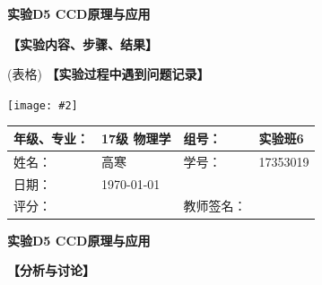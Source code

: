 \documentclass[11pt,a4paper]{ctexart}
\newcommand{\ExpeName}{实验D5 CCD原理与应用}
\newcommand{\cpic}[2]{
\begin{center}
\texttt{[image: \#2]}
\end{center}
}
\begin{document}
\begin{center}
\LARGE{\textbf{\ExpeName}}
\end{center}
\textbf{【实验内容、步骤、结果】}
\par
(表格)
\newline
\textbf{【实验过程中遇到问题记录】}\par
\cpic{0.81}{none}
\fi



\newpage%
\begin{table}[H]
\centering
\begin{tabular}{|p{32mm}|p{32mm}|p{32mm}|p{32mm}|}
\hline
年级、专业： & 17级 物理学 & 组号： & 实验班6 \\ \hline
姓名： & 高寒 & 学号： & 17353019 \\ \hline
日期： & \today &  &  \\ \hline
评分： &  & 教师签名： &  \\ \hline
\end{tabular}
\end{table}
\begin{center}
\LARGE\textbf{{\ExpeName}}
\end{center}
\textbf{【分析与讨论】}\\




\end{document}
